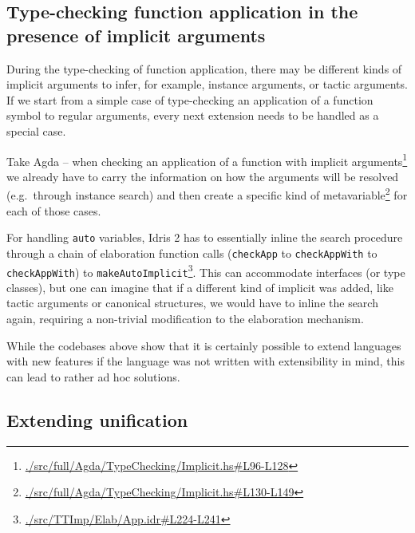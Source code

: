 \hypertarget{sec:implicit-arguments}{%
\subsection{Type-checking function application in the presence of
implicit arguments}\label{sec:implicit-arguments}}

During the type-checking of function application, there may be different
kinds of implicit arguments to infer, for example, instance arguments,
or tactic arguments. If we start from a simple case of type-checking an
application of a function symbol to regular arguments, every next
extension needs to be handled as a special case.

Take Agda -- when checking an application of a function with implicit
arguments\footnote{\href{https://github.com/agda/agda/blob/v2.6.4/src/full/Agda/TypeChecking/Implicit.hs\#L96-L128}{./src/full/Agda/TypeChecking/Implicit.hs\#L96-L128}}
we already have to carry the information on how the arguments will be
resolved (e.g.~through instance search) and then create a specific kind
of metavariable\footnote{\href{https://github.com/agda/agda/blob/v2.6.4/src/full/Agda/TypeChecking/Implicit.hs\#L130-L149}{./src/full/Agda/TypeChecking/Implicit.hs\#L130-L149}}
\citep[chap.~3]{norellPracticalProgrammingLanguage2007} for each of
those cases.

For handling \texttt{auto} variables, Idris 2
\citep[chap.~13.1]{theidristeamIdrisTutorial2021} has to essentially
inline the search procedure through a chain of elaboration function
calls (\texttt{checkApp} to \texttt{checkAppWith} to
\texttt{checkAppWith\textquotesingle{}}) to
\texttt{makeAutoImplicit}\footnote{\href{https://github.com/idris-lang/Idris2/blob/870bc824371d504a03af937f326216302210a875/src/TTImp/Elab/App.idr\#L224-L241}{./src/TTImp/Elab/App.idr\#L224-L241}}.
This can accommodate interfaces (or type classes), but one can imagine
that if a different kind of implicit was added, like tactic arguments or
canonical structures, we would have to inline the search again,
requiring a non-trivial modification to the elaboration mechanism.

While the codebases above show that it is certainly possible to extend
languages with new features if the language was not written with
extensibility in mind, this can lead to rather ad hoc solutions.

\hypertarget{sec:extending-unification}{%
\subsection{Extending unification}\label{sec:extending-unification}}

